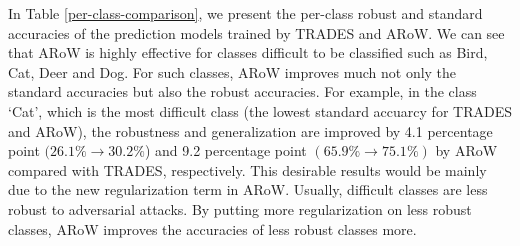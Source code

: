 \documentclass[nohyperref]{article}
\theoremstyle{plain}
\theoremstyle{definition}
\theoremstyle{remark}
\begin{document}
In Table \ref{per-class-comparison}, we present the per-class robust and standard accuracies of the prediction models trained by TRADES and ARoW. 
We can see that ARoW is highly effective 
for classes difficult to be classified such as Bird, Cat, Deer and Dog.
For such classes, ARoW improves much not only the standard accuracies but
also the robust accuracies.
For example, in the class `Cat', which is the most difficult class
(the lowest standard accuarcy for TRADES and ARoW),
the robustness and generalization are improved by 4.1 percentage point $(26.1\% \rightarrow 30.2\%$) and 9.2 percentage point $(65.9\% \rightarrow 75.1\%)$ 
by ARoW compared with TRADES, respectively. This desirable results would be mainly due to the new regularization term in ARoW. Usually, difficult classes are less robust
to adversarial attacks. By putting more regularization on less robust classes, ARoW improves the accuracies of less robust classes more.  
\end{document}
